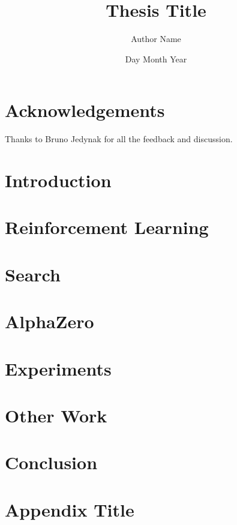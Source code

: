 \documentclass[12pt,twoside]{report}
\title{Thesis Title}
\author{Author Name}
\date{Day Month Year}
\begin{document}




\chapter*{Acknowledgements}
Thanks to Bruno Jedynak for all the feedback and discussion. 

\tableofcontents


\chapter{Introduction}


\chapter{Reinforcement Learning}


\chapter{Search}


\chapter{AlphaZero}


\chapter{Experiments}


\chapter{Other Work}


\chapter{Conclusion}




\appendix
\chapter{Appendix Title}


\listoffigures
\end{document}
